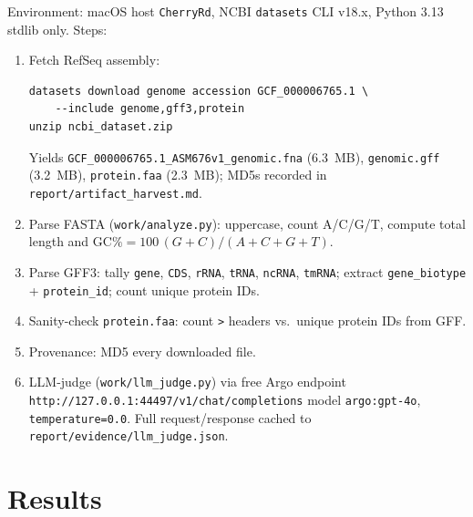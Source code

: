 \documentclass[11pt,letterpaper]{article}
\begin{document}
Environment: macOS host \texttt{CherryRd}, NCBI \texttt{datasets} CLI
v18.x, Python 3.13 stdlib only. Steps:

\begin{enumerate}
\item Fetch RefSeq assembly:
\begin{verbatim}
datasets download genome accession GCF_000006765.1 \
    --include genome,gff3,protein
unzip ncbi_dataset.zip
\end{verbatim}
Yields \texttt{GCF\_000006765.1\_ASM676v1\_genomic.fna} (6.3~MB),
\texttt{genomic.gff} (3.2~MB), \texttt{protein.faa} (2.3~MB); MD5s
recorded in \texttt{report/artifact\_harvest.md}.
\item Parse FASTA (\texttt{work/analyze.py}): uppercase, count A/C/G/T,
compute total length and $\mathrm{GC\%} = 100\,(G+C)/(A+C+G+T)$.
\item Parse GFF3: tally \texttt{gene}, \texttt{CDS}, \texttt{rRNA},
\texttt{tRNA}, \texttt{ncRNA}, \texttt{tmRNA}; extract
\texttt{gene\_biotype} + \texttt{protein\_id}; count unique protein IDs.
\item Sanity-check \texttt{protein.faa}: count \texttt{>} headers vs.\
unique protein IDs from GFF.
\item Provenance: MD5 every downloaded file.
\item LLM-judge (\texttt{work/llm\_judge.py}) via free Argo endpoint
\texttt{http://127.0.0.1:44497/v1/chat/completions} model
\texttt{argo:gpt-4o}, \texttt{temperature=0.0}. Full request/response
cached to \texttt{report/evidence/llm\_judge.json}.
\end{enumerate}

\section{Results}
\end{document}

